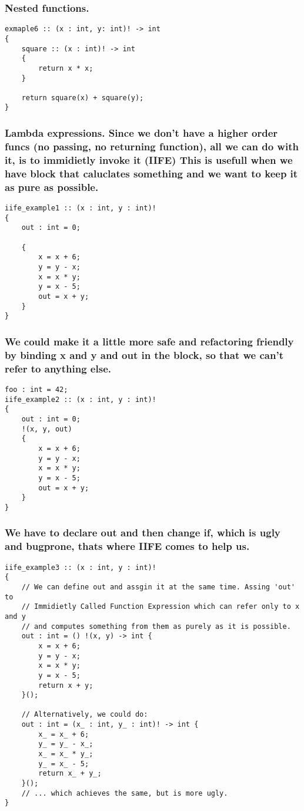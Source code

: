 \documentclass[11pt]{article}
\begin{document}
\subsubsection*{Nested functions.}
\label{sec:orgcfa410e}
\begin{verbatim}
exmaple6 :: (x : int, y: int)! -> int
{
    square :: (x : int)! -> int
    {
        return x * x;
    }

    return square(x) + square(y);
}
\end{verbatim}

\subsubsection*{Lambda expressions. Since we don't have a higher order funcs (no passing, no returning function), all we can do with it, is to immidietly invoke it (IIFE) This is usefull when we have block that caluclates something and we want to keep it as pure as possible.}
\label{sec:org0217d3c}
\begin{verbatim}
iife_example1 :: (x : int, y : int)!
{
    out : int = 0;

    {
        x = x + 6;
        y = y - x;
        x = x * y;
        y = x - 5;
        out = x + y;
    }
}
\end{verbatim}

\subsubsection*{We could make it a little more safe and refactoring friendly by binding x and y and out in the block, so that we can't refer to anything else.}
\label{sec:orgf9555a1}
\begin{verbatim}
foo : int = 42;
iife_example2 :: (x : int, y : int)!
{
    out : int = 0;
    !(x, y, out)
    {
        x = x + 6;
        y = y - x;
        x = x * y;
        y = x - 5;
        out = x + y;
    }
}
\end{verbatim}

\subsubsection*{We have to declare out and then change if, which is ugly and bugprone, thats where IIFE comes to help us.}
\label{sec:org656d2ee}
\begin{verbatim}
iife_example3 :: (x : int, y : int)!
{
    // We can define out and assgin it at the same time. Assing 'out' to
    // Immidietly Called Function Expression which can refer only to x and y
    // and computes something from them as purely as it is possible.
    out : int = () !(x, y) -> int {
        x = x + 6;
        y = y - x;
        x = x * y;
        y = x - 5;
        return x + y;
    }();

    // Alternatively, we could do:
    out : int = (x_ : int, y_ : int)! -> int {
        x_ = x_ + 6;
        y_ = y_ - x_;
        x_ = x_ * y_;
        y_ = x_ - 5;
        return x_ + y_;
    }();
    // ... which achieves the same, but is more ugly.
}
\end{verbatim}
\end{document}
